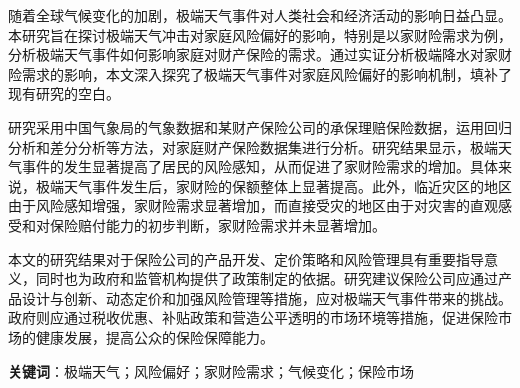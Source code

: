 \begin{cabstract}

    随着全球气候变化的加剧，极端天气事件对人类社会和经济活动的影响日益凸显。本研究旨在探讨极端天气冲击对家庭风险偏好的影响，特别是以家财险需求为例，分析极端天气事件如何影响家庭对财产保险的需求。通过实证分析极端降水对家财险需求的影响，本文深入探究了极端天气事件对家庭风险偏好的影响机制，填补了现有研究的空白。

    研究采用中国气象局的气象数据和某财产保险公司的承保理赔保险数据，运用回归分析和差分分析等方法，对家庭财产保险数据集进行分析。研究结果显示，极端天气事件的发生显著提高了居民的风险感知，从而促进了家财险需求的增加。具体来说，极端天气事件发生后，家财险的保额整体上显著提高。此外，临近灾区的地区由于风险感知增强，家财险需求显著增加，而直接受灾的地区由于对灾害的直观感受和对保险赔付能力的初步判断，家财险需求并未显著增加。

    本文的研究结果对于保险公司的产品开发、定价策略和风险管理具有重要指导意义，同时也为政府和监管机构提供了政策制定的依据。研究建议保险公司应通过产品设计与创新、动态定价和加强风险管理等措施，应对极端天气事件带来的挑战。政府则应通过税收优惠、补贴政策和营造公平透明的市场环境等措施，促进保险市场的健康发展，提高公众的保险保障能力。

    \textbf{关键词}：极端天气；风险偏好；家财险需求；气候变化；保险市场
\end{cabstract}
